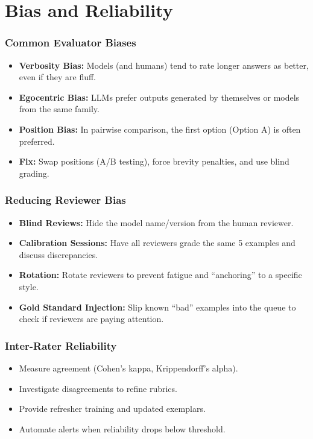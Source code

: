 \documentclass{beamer}
\begin{document}
\section{Bias and Reliability}

\begin{frame}
    \frametitle{Common Evaluator Biases}
    \begin{itemize}
        \item \textbf{Verbosity Bias:} Models (and humans) tend to rate longer answers as better, even if they are fluff.
        \item \textbf{Egocentric Bias:} LLMs prefer outputs generated by themselves or models from the same family.
        \item \textbf{Position Bias:} In pairwise comparison, the first option (Option A) is often preferred.
        \item \textbf{Fix:} Swap positions (A/B testing), force brevity penalties, and use blind grading.
    \end{itemize}
\end{frame}

\begin{frame}
    \frametitle{Reducing Reviewer Bias}
    \begin{itemize}
        \item \textbf{Blind Reviews:} Hide the model name/version from the human reviewer.
        \item \textbf{Calibration Sessions:} Have all reviewers grade the same 5 examples and discuss discrepancies.
        \item \textbf{Rotation:} Rotate reviewers to prevent fatigue and ``anchoring'' to a specific style.
        \item \textbf{Gold Standard Injection:} Slip known ``bad'' examples into the queue to check if reviewers are paying attention.
    \end{itemize}
\end{frame}

\begin{frame}
    \frametitle{Inter-Rater Reliability}
    \begin{itemize}
        \item Measure agreement (Cohen's kappa, Krippendorff's alpha).
        \item Investigate disagreements to refine rubrics.
        \item Provide refresher training and updated exemplars.
        \item Automate alerts when reliability drops below threshold.
    \end{itemize}
\end{frame}
\end{document}
